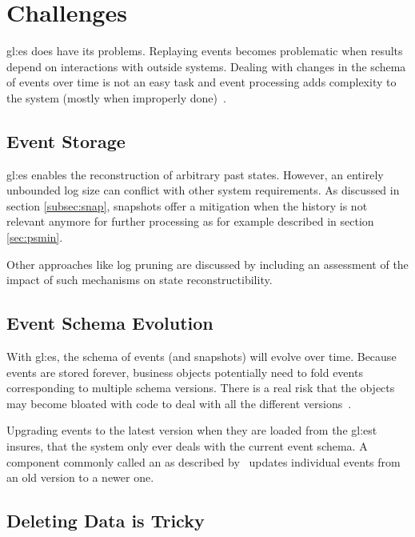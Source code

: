 \section{Challenges}

\gls{gl:es} does have its problems. Replaying events becomes problematic when results depend on interactions with outside systems. Dealing with changes in the schema of events over time is not an easy task and event processing adds complexity to the system (mostly when improperly done)~\citep{esvsed}.

\subsection{Event Storage}

\gls{gl:es} enables the reconstruction of arbitrary past states. However, an entirely unbounded log size can conflict with other system requirements. As discussed in section \ref{subsec:snap}, snapshots offer a mitigation when the history is not relevant anymore for further processing as for example described in section \ref{sec:psmin}.

Other approaches like log pruning are discussed by \citep{10.1145/3210284.3219767} including an assessment of the impact of such mechanisms on state reconstructibility.

\subsection{Event Schema Evolution}

With \gls{gl:es}, the schema of events (and snapshots) will evolve over time. Because events are stored forever, business objects potentially need to fold events corresponding to multiple schema versions. There is a real risk that the objects may become bloated with code to deal with all the different versions~\citep{richardson2018microservices}. 

Upgrading events to the latest version when they are loaded from the \gls{gl:est} insures, that the system only ever deals with the current event schema. A component commonly called an  as described by~\citep{richardson2018microservices} updates individual events from an old version to a newer one.

\subsection{Deleting Data is Tricky}


